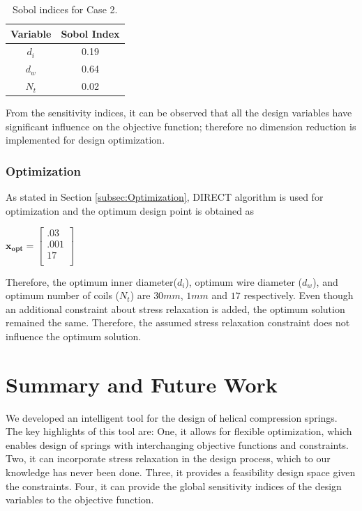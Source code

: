 \documentclass[10pt]{article}
\begin{document}
	\begin{table}[H]
	\caption{Sobol indices for Case 2.}
	\centering
		 \begin{tabular}{ c c}
			 \hline \hline
	 		Variable & Sobol Index\\
			\hline
	 		 $d_{i}$ & 0.19 \\
			 $d_{w}$ & 0.64  \\
			 $N_{t}$ & 0.02 \\ 
			\hline \hline
		 \end{tabular}
	\end{table}


From the sensitivity indices, it can be observed that all the design variables have significant influence on the objective function; therefore no dimension reduction is implemented for design optimization. 


\subsubsection{Optimization}
	
	As stated in Section \ref{subsec:Optimization}, DIRECT algorithm is used for optimization and the optimum design point is obtained as 
	\begin{center}
	$\mathbf{x_{opt}} =
	\left[
	\begin{array}{c}
	 	 .03 \\
	 	 .001 \\
		 17    \\ 
		
	 \end{array}
	 \right]
$	
\end{center}
    Therefore, the optimum inner diameter($d_{i}$), optimum wire diameter ($d_{w}$), and optimum number of coils ($N_{t}$) are $30 mm$, $1 mm$ and $17$ respectively. Even though an additional constraint about stress relaxation is added, the optimum solution remained the same. Therefore, the assumed stress relaxation constraint does not influence the optimum solution.
    
\section{Summary and Future Work}
\label{sec:Summary}

We developed an intelligent tool for the design of helical compression springs. The key highlights of this tool are: One, it allows for flexible optimization, which enables design of springs with interchanging objective functions and constraints. Two, it can incorporate stress relaxation in the design process, which to our knowledge has never been done. Three, it provides a feasibility design space given the constraints. Four, it can provide the global sensitivity indices of the design variables to the objective function. 
\end{document}
